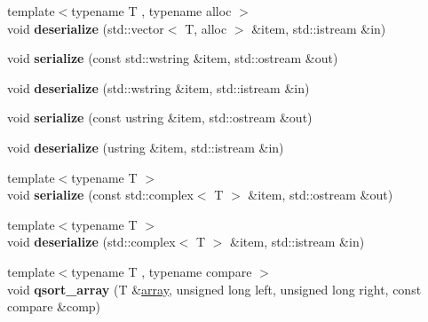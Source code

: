 \begin{DoxyCompactItemize}
\item 
\hypertarget{namespacedlib_aa14e6433b45994673acf66ad05679460}{
{\footnotesize template$<$typename T , typename alloc $>$ }\\void {\bfseries deserialize} (std::vector$<$ T, alloc $>$ \&item, std::istream \&in)}
\label{namespacedlib_aa14e6433b45994673acf66ad05679460}

\item 
\hypertarget{namespacedlib_aba03d630ebab1399951ff2efc53258fe}{
void {\bfseries serialize} (const std::wstring \&item, std::ostream \&out)}
\label{namespacedlib_aba03d630ebab1399951ff2efc53258fe}

\item 
\hypertarget{namespacedlib_a6587fb43c37bb5891a1680271e5d2db6}{
void {\bfseries deserialize} (std::wstring \&item, std::istream \&in)}
\label{namespacedlib_a6587fb43c37bb5891a1680271e5d2db6}

\item 
\hypertarget{namespacedlib_acb3cb215c97a5b5cea0e6224f90ef869}{
void {\bfseries serialize} (const ustring \&item, std::ostream \&out)}
\label{namespacedlib_acb3cb215c97a5b5cea0e6224f90ef869}

\item 
\hypertarget{namespacedlib_a59ca48e244880b2dee83ccd21a9ff8eb}{
void {\bfseries deserialize} (ustring \&item, std::istream \&in)}
\label{namespacedlib_a59ca48e244880b2dee83ccd21a9ff8eb}

\item 
\hypertarget{namespacedlib_affd2021d7bd2c3b01fd232c92b0cb82a}{
{\footnotesize template$<$typename T $>$ }\\void {\bfseries serialize} (const std::complex$<$ T $>$ \&item, std::ostream \&out)}
\label{namespacedlib_affd2021d7bd2c3b01fd232c92b0cb82a}

\item 
\hypertarget{namespacedlib_a3440b6f4db4ad716e217da64cadbb14d}{
{\footnotesize template$<$typename T $>$ }\\void {\bfseries deserialize} (std::complex$<$ T $>$ \&item, std::istream \&in)}
\label{namespacedlib_a3440b6f4db4ad716e217da64cadbb14d}

\item 
\hypertarget{namespacedlib_a500f78eac0d057fd1023a6bb025ce918}{
{\footnotesize template$<$typename T , typename compare $>$ }\\void {\bfseries qsort\_\-array} (T \&\hyperlink{classdlib_1_1array}{array}, unsigned long left, unsigned long right, const compare \&comp)}
\label{namespacedlib_a500f78eac0d057fd1023a6bb025ce918}


\end{DoxyCompactItemize}
